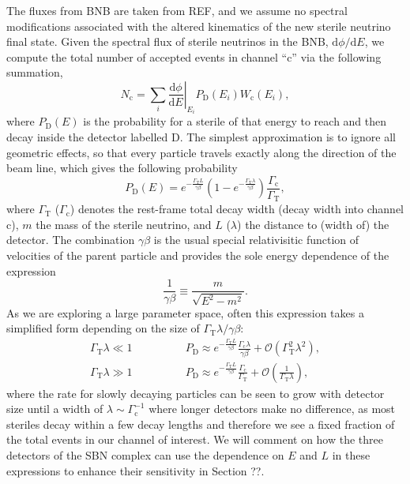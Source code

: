 \documentclass[11pt, a4paper]{article}
\begin{document}
The fluxes from BNB are taken from REF, and we assume no spectral modifications
associated with the altered kinematics of the new sterile neutrino final state.
%
Given the spectral flux of sterile neutrinos in the BNB,
$\mathrm{d}\phi/\mathrm{d}E$, we compute the total number of accepted events in
channel ``$\text{c}$'' via the following summation,
%
\[ N_\text{c} = \sum_{i} \left .
\frac{\mathrm{d}\phi}{\mathrm{d}E}\right|_{E_i} P_\text{D}\left(E_i\right)
W_\text{c}\left(E_i\right),  \]
%
where $P_\text{D}(E)$ is the probability for a sterile of that energy to reach
and then decay inside the detector labelled $\text{D}$. The simplest
approximation is to ignore all geometric effects, so that every particle
travels exactly along the direction of the beam line, which gives the following
probability 
%
\[ P_\text{D}\left(E\right) = e^{-\frac{\Gamma_\text{T}L}{\gamma\beta}}\left(
1-
e^{-\frac{\Gamma_\text{T}\lambda}{\gamma\beta}}\right)\frac{\Gamma_\text{c}}{\Gamma_\text{T}},
\label{eq:prob}
\]
%
where $\Gamma_\text{T}$ ($\Gamma_\text{c}$) denotes the rest-frame total decay
width (decay width into channel $\text{c}$), $m$ the mass of the sterile
neutrino, and $L$ ($\lambda$) the distance to (width of) the detector. The
combination $\gamma\beta$ is the usual special relativisitic function of
velocities of the parent particle and provides the sole energy dependence of
the expression
%
\[   \frac{1}{\gamma\beta} \equiv \frac{m}{\sqrt{E^2-m^2}}. \]
%
As we are exploring a large parameter space, often this expression takes a
simplified form depending on the size of $\Gamma_\text{T}\lambda/\gamma\beta$:
%
\begin{align*} 
%
\Gamma_\text{T}\lambda \ll 1\qquad&\qquad P_\text{D} \approx
e^{-\frac{\Gamma_\text{T}L}{\gamma\beta}}\frac{\Gamma_\text{c}\lambda}{\gamma\beta}
+ \mathcal{O}\left(\Gamma_\text{T}^2\lambda^2\right),\\ 
%
\Gamma_\text{T}\lambda \gg 1\qquad&\qquad P_\text{D} \approx
e^{-\frac{\Gamma_\text{T}L}{\gamma\beta}}\frac{\Gamma_\text{c}}{\Gamma_\text{T}}
+ \mathcal{O}\left(\frac{1}{\Gamma_\text{T}\lambda}\right), 
%
\end{align*}
%
where the rate for slowly decaying particles can be seen to grow with detector
size until a width of $\lambda\sim\Gamma_\text{c}^{-1}$ where longer detectors
make no difference, as most steriles decay within a few decay lengths and
therefore we see a fixed fraction of the total events in our channel of interest. 
We will comment on how the three detectors of the SBN complex can use the 
dependence on $E$ and $L$ in these expressions to enhance their sensitivity in 
Section ??.
\end{document}
